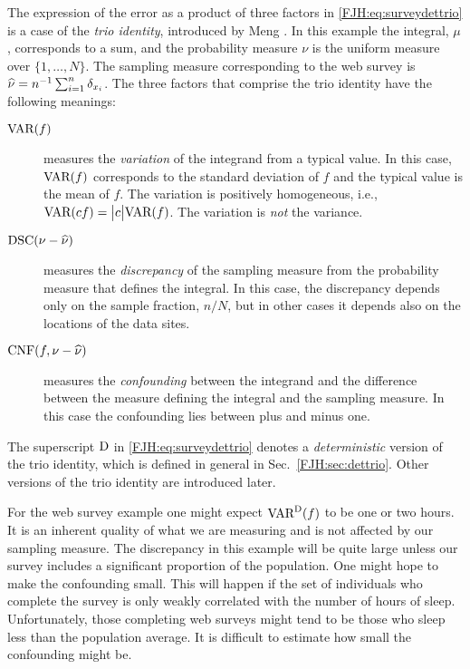 \documentclass[graybox,footinfo]{svmult}
\begin{document}
The expression of the error as a product of three factors in 
\eqref{FJH:eq:surveydettrio} is a case of the \emph{trio identity}, introduced by Meng 
\cite{Men16a}.  In this example the integral, $\mu$, corresponds to a sum, 
and the probability measure $\nu$ is the uniform measure over $\{1, 
\ldots, N\}$.  The sampling measure corresponding to the web survey is $\widehat{\nu} = 
n^{-1} \sum_{i=1}^n \delta_{x_i}$.  The three factors that comprise the trio identity have 
the 
following meanings:
\begin{description}
	\item[$\textup{VAR}(f)$] measures the \emph{variation} of the integrand from a typical value. 
	In 	this case, $\textup{VAR}(f)$ corresponds to the standard deviation of $f$ and the typical 
	value	is the mean of $f$. The variation is positively homogeneous, i.e., $\textup{VAR}(cf)  = 
	\bigl \lvert c \bigr \rvert \textup{VAR}(f)$.  The variation is \emph{not} the variance.
	\item [$\textup{DSC}(\nu - \widehat{\nu})$] measures the \emph{discrepancy} of the sampling 
	measure 
	from the probability measure that defines the integral.  In this case, the discrepancy 
	depends only on the sample fraction, $n/N$, but in other cases it depends also on the 
	locations of the data sites.
	\item [$\textup{CNF}(f,\nu - \widehat{\nu})$] measures the \emph{confounding} between the 
	integrand and the difference between the measure defining the integral and the 
	sampling measure.  In this case the confounding lies between plus and minus one.
\end{description}
The superscript $\textup{D}$ in \eqref{FJH:eq:surveydettrio} denotes a \emph{deterministic} 
version of the trio identity, which is defined in general in Sec.\ \ref{FJH:sec:dettrio}. 
Other versions of the trio identity are introduced later.

\begin{FJHLesson}
	\FJHLessonZero
\end{FJHLesson}

For the web survey example one might expect $\textup{VAR}^{\textup{D}}(f)$ to be one or two hours.  It 
is an inherent quality of what we are measuring and is not affected by our sampling 
measure.  The discrepancy in this example will be quite large unless our survey includes a 
significant proportion of the population.  One might hope to make  the confounding 
small.  This will happen if the set of individuals who complete the survey 
is only weakly correlated with the number of hours of sleep.  Unfortunately, those  
completing web surveys might tend to be those who sleep less than the 
population average.  It is difficult to estimate how small the confounding might be.  
\end{document}
